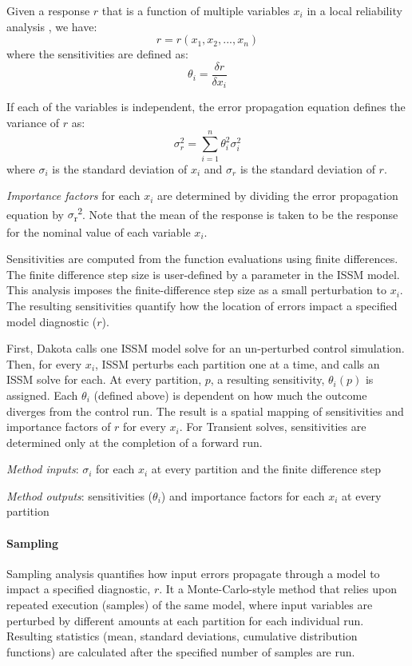 Given a response $r$ that is a function of multiple variables $x_i$ in a local reliability analysis \cite{Coleman1999}, we have:
\begin{equation}
	r=r(x_1,x_2,...,x_n)
\end{equation}
where the sensitivities are defined as:
\begin{equation}
	\theta_i=\frac{\delta r}{\delta x_i}
\end{equation}

If each of the variables is independent, the error propagation equation defines the variance of $r$ as:
\begin{equation}
	\sigma_r^2=\sum_{i=1}^n\theta_i^2 \sigma_i^2
\end{equation}
where $\sigma_i$ is the standard deviation of $x_i$ and $\sigma_r$ is the standard deviation of $r$.

\emph{Importance factors} for each $x_i$ are determined by dividing the error propagation equation by $\sigma$\textsubscript{r}\textsuperscript{2}. Note that the mean of the response is taken to be the response for the nominal value of each variable $x_i$.

Sensitivities are computed from the function evaluations using finite differences. The finite difference step size is user-defined by a parameter in the ISSM model. This analysis imposes the finite-difference step size as a small perturbation to $x_i$. The resulting sensitivities quantify
how the location of errors impact a specified model diagnostic ($r$).

First, Dakota calls one ISSM model solve for an un-perturbed control simulation. Then, for every $x_i$, ISSM perturbs each partition one at a time, and calls an ISSM solve for each. At every partition, $p$, a resulting sensitivity, $\theta_i(p)$ is assigned. Each $\theta_i$ (defined above) is dependent on how much the outcome diverges from the control run. The result is a spatial mapping of sensitivities and importance factors of $r$ for every $x_i$. For Transient solves, sensitivities are determined only at the completion of a forward run.

\emph{Method inputs}: $\sigma_i$ for each $x_i$ at every partition and the finite difference step

\emph{Method outputs}: sensitivities ($\theta_i$) and importance factors for each $x_i$ at every partition

\paragraph{Sampling}
Sampling analysis quantifies how input errors propagate through a model to impact a specified diagnostic, $r$. It a Monte-Carlo-style method that relies upon repeated execution (samples) of the same model, where input variables are perturbed by different amounts at each partition for each individual run. Resulting statistics (mean, standard deviations, cumulative distribution functions) are calculated after the specified number of samples are run.

